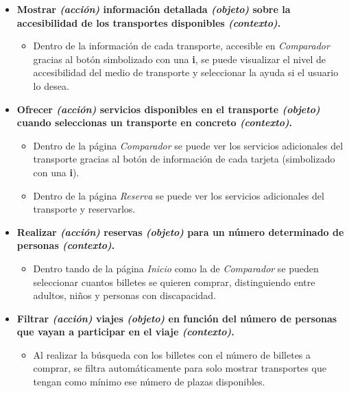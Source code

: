 \begin{itemize}
    \item \textbf{Mostrar \textit{(acción)} información detallada \textit{(objeto)} sobre la accesibilidad de los transportes 
        disponibles \textit{(contexto)}.}
        \begin{itemize}
            \item Dentro de la información de cada transporte, accesible en \textit{Comparador} gracias al botón simbolizado con una \textbf{i}, se puede visualizar el nivel de accesibilidad del medio de
                transporte y seleccionar la ayuda si el usuario lo desea.
        \end{itemize}
    
    \item \textbf{Ofrecer \textit{(acción)} servicios disponibles en el transporte \textit{(objeto)} cuando seleccionas un transporte
        en concreto \textit{(contexto)}.}
        \begin{itemize}
            \item Dentro de la página \textit{Comparador} se puede ver los servicios adicionales del transporte gracias al
                botón de información de cada tarjeta (simbolizado con una \textbf{i}).
            \item Dentro de la página \textit{Reserva} se puede ver los servicios adicionales del transporte y reservarlos.
        \end{itemize}
    
    \item \textbf{Realizar \textit{(acción)} reservas \textit{(objeto)} para un número determinado de personas \textit{(contexto)}.}
        \begin{itemize}
            \item Dentro tando de la página \textit{Inicio} como la de \textit{Comparador} se pueden seleccionar cuantos billetes se
                quieren comprar, distinguiendo entre adultos, niños y personas con discapacidad.
        \end{itemize}

    \item \textbf{Filtrar \textit{(acción)} viajes \textit{(objeto)} en función del número de personas que vayan a participar en el viaje \textit{(contexto)}.}
        \begin{itemize}
            \item Al realizar la búsqueda con los billetes con el número de billetes a comprar, se filtra automáticamente para solo mostrar transportes
                que tengan como mínimo ese número de plazas disponibles.
        \end{itemize}


\end{itemize}
